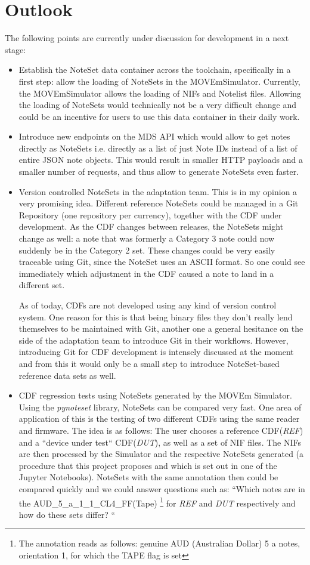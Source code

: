 \section{Outlook}
\label{section:outlook}
The following points are currently under discussion for development in a next stage:
\begin{itemize}
	\item Establish the NoteSet data container across the toolchain, specifically in a first step: allow the loading of NoteSets in the MOVEmSimulator. Currently, the MOVEmSimulator allows the loading of NIFs and Notelist files. Allowing the loading of NoteSets would technically not be a very difficult change and could be an incentive for users to use this data container in their daily work.
	\item Introduce new endpoints on the MDS API which would allow to get notes directly as NoteSets i.e. directly as a list of just Note IDs instead of a list of entire JSON note objects. This would result in smaller HTTP payloads and a smaller number of requests, and thus allow to generate NoteSets even faster.
	\item Version controlled NoteSets in the adaptation team. This is in my opinion a very promising idea. Different reference NoteSets could be managed in a Git Repository (one repository per currency), together with the CDF under development. As the CDF changes between releases, the NoteSets might change as well: a note that was formerly a Category 3 note could now suddenly be in the Category 2 set. These changes could be very easily traceable using Git, since the NoteSet uses an ASCII format. So one could see immediately which adjustment in the CDF caused a note to land in a different set.\par
	As of today, CDFs are not developed using any kind of version control system. One reason for this is that being binary files they don't really lend themselves to be maintained with Git, another one a general hesitance on the side of the adaptation team to introduce Git in their workflows. However, introducing Git for CDF development is intensely discussed at the moment and from this it would only be a small step to introduce NoteSet-based reference data sets as well.
	\item CDF regression tests using NoteSets generated by the MOVEm Simulator. Using the \emph{pynoteset} library, NoteSets can be compared very fast. One area of application of this is the testing of two different CDFs using the same reader and firmware. The idea is as follows: The user chooses a reference CDF(\emph{REF}) and a ``device under test`` CDF(\emph{DUT}), as well as a set of NIF files. The NIFs are then processed by the Simulator and the respective NoteSets generated (a procedure that this project proposes and which is set out in one of the Jupyter Notebooks). NoteSets with the same annotation then could be compared quickly and we could answer questions such as: ``Which notes are in the AUD\_5\_a\_1\_1\_CL4\_FF(Tape) \footnote{The annotation reads as follows: genuine AUD (Australian Dollar) 5 a notes, orientation 1, for which the TAPE flag is set} for \emph{REF} and \emph{DUT} respectively and how do these sets differ? ``
\end{itemize}